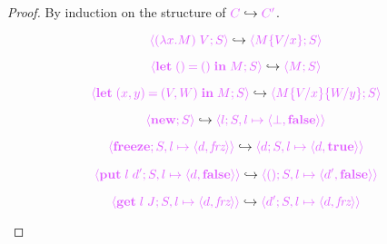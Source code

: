 \begin{proof}
  By induction on the structure of $\tm{C}\red\tm{C'}$.
  \begin{case}{}
    \[
      \tm{\config{(\lambda x.M)\;V}{S}}
      \red
      \tm{\config{\subst{M}{V}{x}}{S}}
    \]
  \end{case}
  \begin{case}{}
    \[
      \tm{\config{\letunit{\unit}{M}}{S}}
      \red
      \tm{\config{M}{S}}
    \]
  \end{case}
  \begin{case}{}    
    \[
      \tm{\config{\letpair{x}{y}{\pair{V}{W}}{M}}{S}}
      \red 
      \tm{\config{\subst{\subst{M}{V}{x}}{W}{y}}{S}}
    \]
  \end{case}
  \begin{case}{}     
    \[
      \tm{\config{\lvarnew}{S}}
      \red
      \tm{\config{l}{S, l \mapsto\st{\botD}{\false}}}
    \]
  \end{case}
  \begin{case}{}  
    \[
      \tm{\config{\lvarfreeze}{S, l \mapsto\st{d}{\frz}}}
      \red
      \tm{\config{d}{S, l \mapsto\st{d}{\true}}}
    \]
  \end{case}
  \begin{case}{}     
    \[
      \tm{\config{\lvarput\;l\;d'}{S, l \mapsto\st{d}{\false}}}
      \red
      \tm{\config{()}{S, l \mapsto\st{d'}{\false}}}
    \]
  \end{case}
  \begin{case}{}     
    \[
      \tm{\config{\lvarget\;l\;J}{S, l \mapsto\st{d}{\frz}}}
      \red
      \tm{\config{d'}{S, l \mapsto\st{d}{\frz}}}
    \]
  \end{case}
\end{proof}

